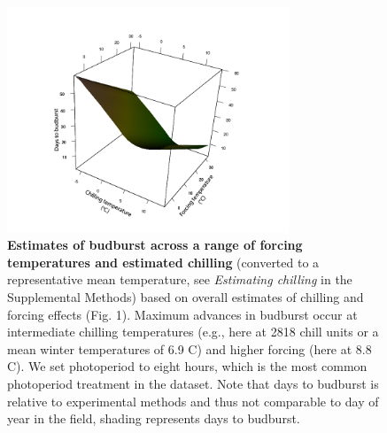 \documentclass{article}
\begin{document}
\begin{figure}[h!]
\centering
\noindent \includegraphics[width=0.75\textwidth]{..//..//analyses/bb_analysis/figures/bbmod_3dplot_utah_withPEP.png}
\caption{\textbf{Estimates of budburst across a range of forcing temperatures and estimated chilling} (converted to a representative mean temperature, see \emph{Estimating chilling} in the Supplemental Methods) based on overall estimates of chilling and forcing effects (Fig. 1). Maximum advances in budburst occur at intermediate chilling temperatures (e.g., here at 2818 chill units or a mean winter temperatures of 6.9 \degree C) and higher forcing (here at 8.8 \degree C). We set photoperiod to eight hours, which is the most common photoperiod treatment in the dataset. Note that days to budburst is relative to experimental methods and thus not comparable to day of year in the field, shading represents days to budburst.} %
\label{fig:apc}
\end{figure}
\newpage
\end{document}
